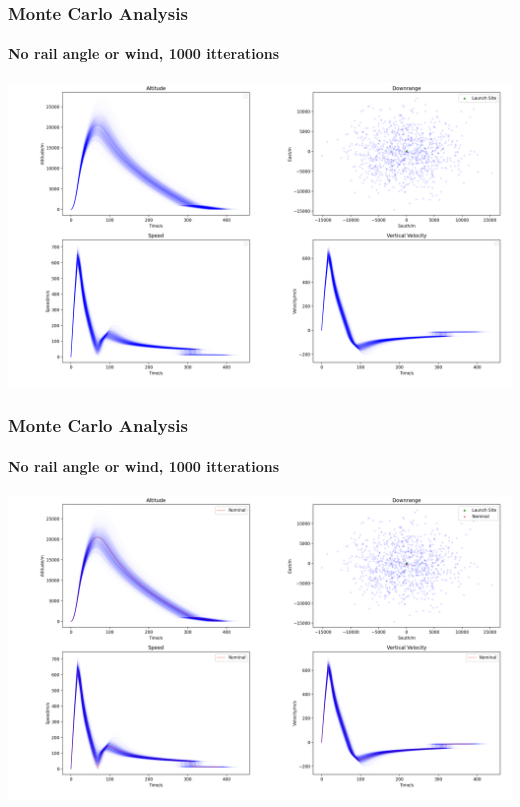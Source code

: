 \documentclass{beamer}
\begin{document}
    \begin{frame}
        \frametitle{Monte Carlo Analysis}
        \framesubtitle{No rail angle or wind, 1000 itterations}
        \begin{center}
            \includegraphics[width=\textwidth]{images/stats_example1.png}
        \end{center}
    \end{frame}
    \begin{frame}
        \frametitle{Monte Carlo Analysis}
        \framesubtitle{No rail angle or wind, 1000 itterations}
        \begin{center}
            \includegraphics[width=\textwidth]{images/stats_example1_with_nom.png}
        \end{center}
    \end{frame}
\end{document}
